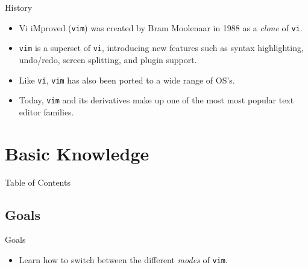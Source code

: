 \documentclass{beamer}
\begin{document}
\begin{frame}{History}
	\begin{itemize}
		\item Vi iMproved (\texttt{vim}) was created by Bram Moolenaar
			in 1988 as a \textit{clone} of \texttt{vi}.
			\pause

		\item \texttt{vim} is a superset of \texttt{vi}, introducing new
			features such as syntax highlighting, undo/redo, screen
			splitting, and plugin support.
			\pause

		\item Like \texttt{vi}, \texttt{vim} has also been ported to a
			wide range of OS's.
			\pause

		\item Today, \texttt{vim} and its derivatives make up one of the
			most most popular text editor families.\footnotemark
	\end{itemize}

\end{frame}


\section{Basic Knowledge}
\begin{frame}{Table of Contents}
	\tableofcontents[currentsection]
\end{frame}

\subsection{Goals}
\begin{frame}{Goals}
	\begin{itemize}
		\item Learn how to switch between the different \textit{modes}
			of \texttt{vim}.
	\end{itemize}
\end{frame}
\end{document}
